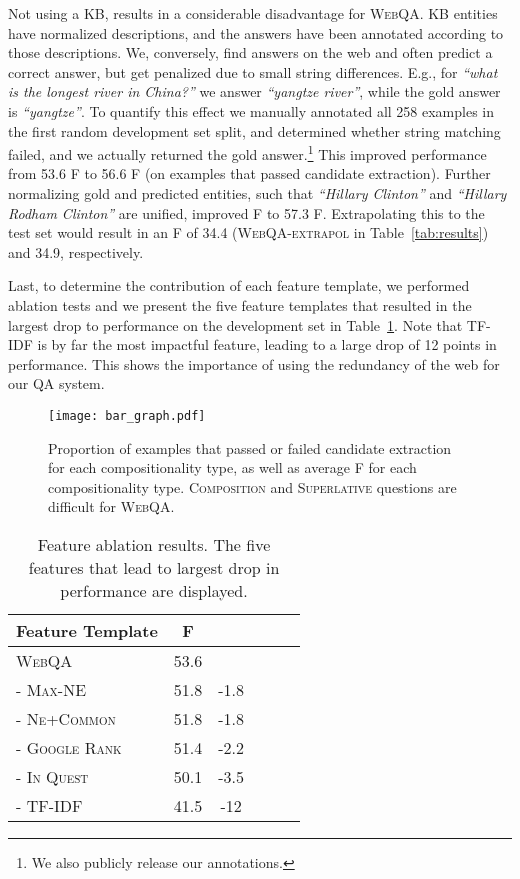 \documentclass[11pt,a4paper]{article}
\newcommand\nl[1]{{\it``#1''}}
\begin{document}
Not using a KB, results in a considerable disadvantage for \textsc{WebQA}.
KB entities have normalized descriptions, and the answers have been annotated according to those descriptions.
We, conversely, find answers on the web and often predict a correct answer, but get penalized due to small string differences. 
E.g., for \nl{what is the longest river in China?} we answer \nl{yangtze river}, while the gold answer is \nl{yangtze}.
To quantify this effect we manually annotated all 258 examples in the first random development set split, and determined whether string matching failed, and we actually returned the gold answer.\footnote{We also publicly release our annotations.} 
This improved performance from 53.6 F  to 56.6 F (on examples that passed candidate extraction). Further normalizing gold and predicted entities, such that \nl{Hillary Clinton} and \nl{Hillary Rodham Clinton} are unified, improved F to 57.3 F. Extrapolating this to the test set would result in an F of 34.4 (\textsc{WebQA-extrapol} in Table~\ref{tab:results}) and 34.9, respectively.

Last, to determine the contribution of each feature template, we performed ablation tests and we present the five feature templates that resulted in the largest drop to performance on the development set in Table~\ref{tab:ablation}. 
Note that TF-IDF is by far the most impactful feature, leading to a large drop of 12 points in performance. This shows the importance of using the redundancy of the web for our QA system.

\begin{figure}
\centering
\texttt{[image: bar\_graph.pdf]}
\caption{Proportion of examples that passed or failed candidate extraction for each compositionality type, as well as average F for each compositionality type. \textsc{Composition} and \textsc{Superlative} questions are difficult for \textsc{WebQA}.}
\label{fig:compositionality}
\end{figure}
\begin{table}[t]
\begin{center}
\scriptsize{
\begin{tabular}{l|c|c|c|c|c|}
 \toprule 
 \textbf{Feature Template} & \textbf{F} & \textbf{} \\ 
 \midrule
\textsc{WebQA} & 53.6 & \\  
\hline
\textsc{- Max-NE} & 51.8 & -1.8 \\
\textsc{- Ne+Common} & 51.8 & -1.8 \\
\textsc{- Google Rank} & 51.4 & -2.2 \\
\textsc{- In Quest} & 50.1 & -3.5\\ 
\textsc{- TF-IDF} & 41.5 & -12\\ 
\toprule
\end{tabular}}
\end{center}
\caption{Feature ablation results. The five features that lead to largest drop in performance are displayed.}
\label{tab:ablation}
\end{table}
\end{document}
